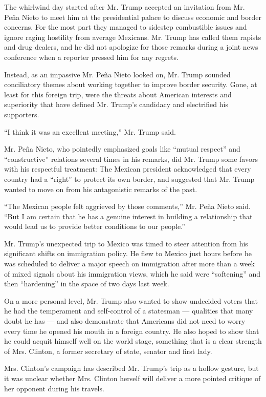 The whirlwind day started after Mr. Trump accepted an invitation from
Mr. Peña Nieto to meet him at the presidential palace to discuss
economic and border concerns. For the most part they managed to sidestep
combustible issues and ignore raging hostility from average Mexicans.
Mr. Trump has called them rapists and drug dealers, and he did not
apologize for those remarks during a joint news conference when a
reporter pressed him for any regrets.

Instead, as an impassive Mr. Peña Nieto looked on, Mr. Trump sounded
conciliatory themes about working together to improve border security.
Gone, at least for this foreign trip, were the threats about American
interests and superiority that have defined Mr. Trump's candidacy and
electrified his supporters.

``I think it was an excellent meeting,'' Mr. Trump said.

Mr. Peña Nieto, who pointedly emphasized goals like ``mutual respect''
and ``constructive'' relations several times in his remarks, did Mr.
Trump some favors with his respectful treatment: The Mexican president
acknowledged that every country had a ``right'' to protect its own
border, and suggested that Mr. Trump wanted to move on from his
antagonistic remarks of the past.

``The Mexican people felt aggrieved by those comments,'' Mr. Peña Nieto
said. ``But I am certain that he has a genuine interest in building a
relationship that would lead us to provide better conditions to our
people.''

Mr. Trump's unexpected trip to Mexico was timed to steer attention from
his significant shifts on immigration policy. He flew to Mexico just
hours before he was scheduled to deliver a major speech on immigration
after more than a week of mixed signals about his immigration views,
which he said were ``softening'' and then ``hardening'' in the space of
two days last week.

On a more personal level, Mr. Trump also wanted to show undecided voters
that he had the temperament and self-control of a statesman ---
qualities that many doubt he has --- and also demonstrate that Americans
did not need to worry every time he opened his mouth in a foreign
country. He also hoped to show that he could acquit himself well on the
world stage, something that is a clear strength of Mrs. Clinton, a
former secretary of state, senator and first lady.

Mrs. Clinton's campaign has described Mr. Trump's trip as a hollow
gesture, but it was unclear whether Mrs. Clinton herself will deliver a
more pointed critique of her opponent during his travels.

